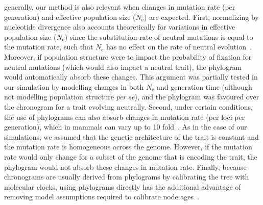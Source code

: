 \documentclass{article}
\newcommand{\Ne}{N_{\text{e}}}
\providecommand{\DIFaddtex}[1]{{\protect\color{blue}\uwave{#1}}} %
\providecommand{\DIFaddend}{} %
\providecommand{\DIFadd}[1]{\texorpdfstring{\DIFaddtex{#1}}{#1}} %
\DeclareRobustCommand{\DIFaddend}{\DIFOaddend \let\includegraphics\DIFOincludegraphics} %
\begin{document}
\DIFadd{More }\DIFaddend generally, our method is also relevant when changes in mutation rate (per generation) and effective population size ($\Ne$) are expected.
First, normalizing by nucleotide divergence also accounts theoretically for variations in effective population size ($\Ne$) since the substitution rate of neutral mutations is equal to the mutation rate, such that $\Ne$ has no effect on the rate of neutral evolution~\citep{kimura_evolutionary_1968, ohta_population_1972}.
Moreover, if population structure were to impact the probability of fixation for neutral mutations (which would also impact a neutral trait), the phylogram would automatically absorb these changes.
This argument was partially tested in our simulation by modelling changes in both $\Ne$ and generation time (although not modelling population structure \textit{per se}), and the phylogram was favoured over the chronogram for a trait evolving neutrally.
Second, under certain conditions, the use of phylograms can also absorb changes in mutation rate (per loci per generation), which in mammals can vary up to 10 fold~\citep{bergeron_evolution_2023}.
As in the case of our simulations, we assumed that the genetic architecture of the trait is constant and the mutation rate is homogeneous across the genome.
However, if the mutation rate would only change for a subset of the genome that is encoding the trait, the phylogram would not absorb these changes in mutation rate.
Finally, because chronograms are usually derived from phylograms by calibrating the tree with molecular clocks, using phylograms directly has the additional advantage of removing model assumptions required to calibrate node ages~\citep{litsios_effects_2012}.
\end{document}
